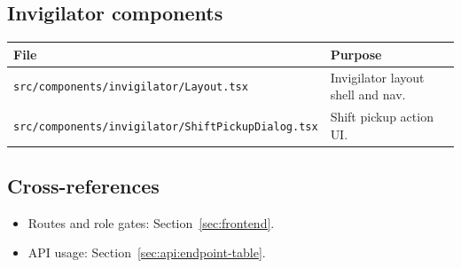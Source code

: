 \subsection{Invigilator components}
\label{subsec:frontend:components:detail:invigilator}

\begin{longtable}{p{}p{}}
\toprule
\textbf{File} & \textbf{Purpose} \\
\midrule
\texttt{src/components/invigilator/Layout.tsx} & Invigilator layout shell and nav. \\
\texttt{src/components/invigilator/ShiftPickupDialog.tsx} & Shift pickup action UI. \\
\bottomrule
\end{longtable}

\subsection{Cross-references}
\label{subsec:frontend:components:detail:links}

\begin{itemize}
  \item Routes and role gates: Section~\ref{sec:frontend}.
  \item API usage: Section~\ref{sec:api:endpoint-table}.
\end{itemize}
